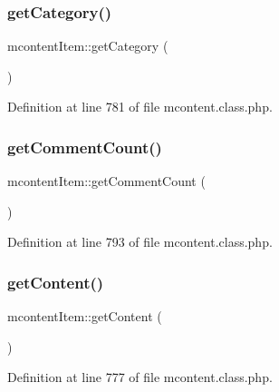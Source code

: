 \subsubsection{\texorpdfstring{get\+Category()}{getCategory()}}
{\footnotesize\ttfamily mcontent\+Item\+::get\+Category (\begin{DoxyParamCaption}{ }\end{DoxyParamCaption})}



Definition at line 781 of file mcontent.\+class.\+php.

\mbox{\label{classmcontentItem_ac60221ec5be0a8158c5248c09efd8fb1}} 
\subsubsection{\texorpdfstring{get\+Comment\+Count()}{getCommentCount()}}
{\footnotesize\ttfamily mcontent\+Item\+::get\+Comment\+Count (\begin{DoxyParamCaption}{ }\end{DoxyParamCaption})}



Definition at line 793 of file mcontent.\+class.\+php.

\mbox{\label{classmcontentItem_a19b333e6ff14db6f7f77c3f94471bdff}} 
\subsubsection{\texorpdfstring{get\+Content()}{getContent()}}
{\footnotesize\ttfamily mcontent\+Item\+::get\+Content (\begin{DoxyParamCaption}{ }\end{DoxyParamCaption})}



Definition at line 777 of file mcontent.\+class.\+php.

\mbox{\label{classmcontentItem_a60fe1f5cbd47314c2910a8782a3252a9}} 
